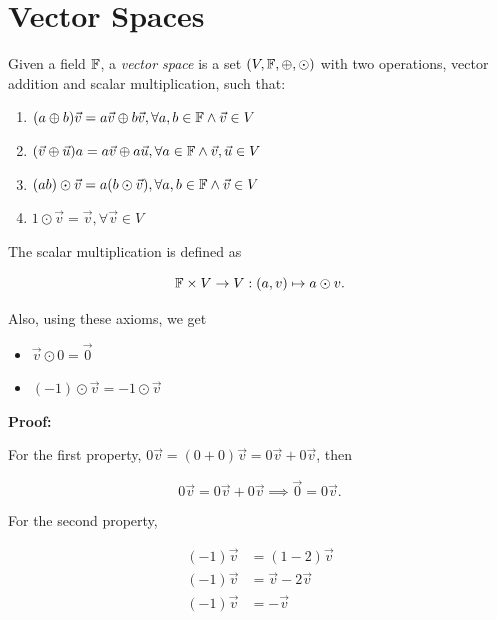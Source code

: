 \chapter{Vector Spaces}

Given a field \(\mathbb{F}\), a \emph{vector space} is a set \((V, \mathbb{F}, \oplus , \odot)\) with two operations, vector addition and scalar multiplication,
such that:

\begin{enumerate}[label=\Roman*.]

	\item \((a \oplus b)\vec{v} = a\vec{v} \oplus b\vec{v}, \forall a,b \in \mathbb{F} \land \vec{v} \in V\)

	\item \((\vec{v} \oplus \vec{u})a = a\vec{v} \oplus a\vec{u}, \forall a\in \mathbb{F} \land \vec{v}, \vec{u} \in V\)

	\item \((ab)\odot \vec{v} = a(b \odot\vec{v}), \forall a,b \in \mathbb{F} \land \vec{v} \in V\)

	\item \(1 \odot \vec{v} = \vec{v}, \forall \vec{v} \in V\)

\end{enumerate}

The scalar multiplication is defined as

\[
	\mathbb{F} \times  V \to V: (a,v) \mapsto a \odot v.
\]

Also, using these axioms, we get

\begin{itemize}

	\item \(\vec{v} \odot 0 = \vec{0}\)

	\item \((-1) \odot \vec{v} = -1 \odot \vec{v}\)

\end{itemize}

\textbf{Proof:}

For the first property, \(0\vec{v} = (0 + 0)\vec{v} = 0\vec{v} + 0\vec{v}\), then

\[
	0\vec{v} = 0\vec{v} + 0\vec{v} \implies \vec{0} = 0\vec{v}.
\]

For the second property,

\begin{align*}
	(-1)\vec{v} & = (1 - 2)\vec{v}     \\
	(-1)\vec{v} & = \vec{v} - 2\vec{v} \\
	(-1)\vec{v} & = -\vec{v}
\end{align*}

